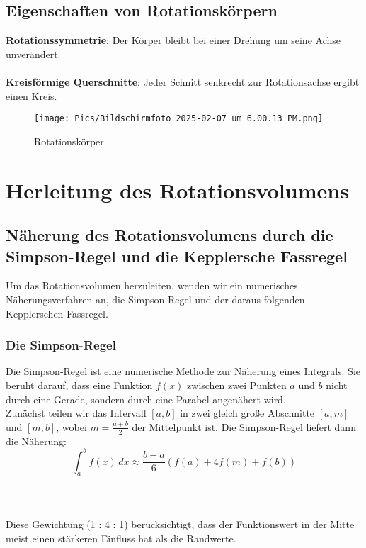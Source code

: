 \documentclass[a4paper,final]{report}
\begin{document}
\section{Eigenschaften von Rotationskörpern}

\textbf{Rotationssymmetrie}: Der Körper bleibt bei einer Drehung um seine Achse unverändert.  \\
\\ \textbf{Kreisförmige Querschnitte}: Jeder Schnitt senkrecht zur Rotationsachse ergibt einen Kreis.  \\

\begin{figure}[h]
    \centering
    \texttt{[image: Pics/Bildschirmfoto 2025-02-07 um 6.00.13 PM.png]}
    \caption{Rotationskörper}
    \label{fig:enter-label}
\end{figure}
\cite{lambacher_schweizer}

\chapter{Herleitung des Rotationsvolumens}

\section{Näherung des Rotationsvolumens durch die Simpson-Regel und die Kepplersche Fassregel}

Um das Rotationsvolumen herzuleiten, wenden wir ein numerisches Näherungsverfahren an, die Simpson-Regel und der daraus folgenden Kepplerschen Fassregel.


\subsection{Die Simpson-Regel}

Die Simpson-Regel ist eine numerische Methode zur Näherung eines Integrals. Sie beruht darauf, dass eine Funktion \( f(x) \) zwischen zwei Punkten \( a \) und \( b \) nicht durch eine Gerade, sondern durch eine Parabel angenähert wird.
\\
Zunächst teilen wir das Intervall \( [a,b] \) in zwei gleich große Abschnitte \( [a,m] \) und \( [m,b] \), wobei \( m = \frac{a+b}{2} \) der Mittelpunkt ist. Die Simpson-Regel liefert dann die Näherung:
\\
\[
\int_a^b f(x) \, dx \approx \frac{b-a}{6} \left( f(a) + 4f(m) + f(b) \right)
\] 
\\
\cite{math24_simpson} \\ \\ Diese Gewichtung (1 : 4 : 1) berücksichtigt, dass der Funktionswert in der Mitte meist einen stärkeren Einfluss hat als die Randwerte.
\\
\end{document}
